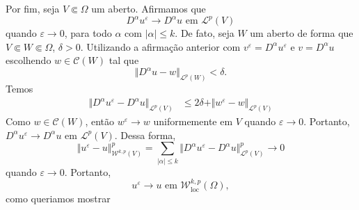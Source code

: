 \documentclass[a4paper, 11pt]{book}
\theoremstyle{definition}
\newcommand{\cC}{\mathcal{C}}
\newcommand{\cL}{\mathcal{L}}
\newcommand{\cW}{\mathcal{W}}
\newcommand{\loc}{\mathrm{loc}}
\begin{document}
\begin{prf}
    Por fim, seja $V \Subset \Omega$ um aberto. Afirmamos que
    \begin{equation}
        D ^\alpha u^\varepsilon \to D^\alpha u \text{ em } \cL^p(V)
    \end{equation}
    quando $\varepsilon \to 0$, para todo $\alpha$ com $|\alpha| \leqslant k$.
    De fato, seja $W$ um aberto de forma que $V \Subset W \Subset \Omega$, $\delta > 0$. Utilizando a afirmação anterior com $v ^\varepsilon = D^\alpha u^\varepsilon$ e $v = D^\alpha u$ escolhendo $w \in \cC(W)$ tal que
    \[
        \Vert D^\alpha u - w \Vert_{\cL^p(W)} < \delta.
    \]
    Temos
    \[
        \begin{aligned}
            \Vert D^\alpha u^\varepsilon - D^\alpha u \Vert_{\cL^p(V)} 
            &\leqslant 2\delta + \Vert w^\varepsilon - w \Vert_{\cL^p(V)}
        \end{aligned}
    \]
    Como $w \in \cC(W)$, então $w^\varepsilon \to w$ uniformemente em $V$ quando $\varepsilon \to 0$. 
    Portanto, $D^\alpha u^\varepsilon \to D^\alpha u$ em $\cL^p(V)$.
    Dessa forma,
    \[
        \Vert u^\varepsilon - u \Vert^p_{\cW^{k,p}(V)} = \sum_{|\alpha| \leqslant k} \Vert D^\alpha u^\varepsilon - D^\alpha u \Vert^p_{\cL^p(V)} \to 0 
    \]
    quando $\varepsilon \to 0$. Portanto,
    \[
        u^\varepsilon \to u \text{ em } \cW^{k,p}_\loc(\Omega),
    \]
    como queriamos mostrar
\end{prf}
\end{document}
